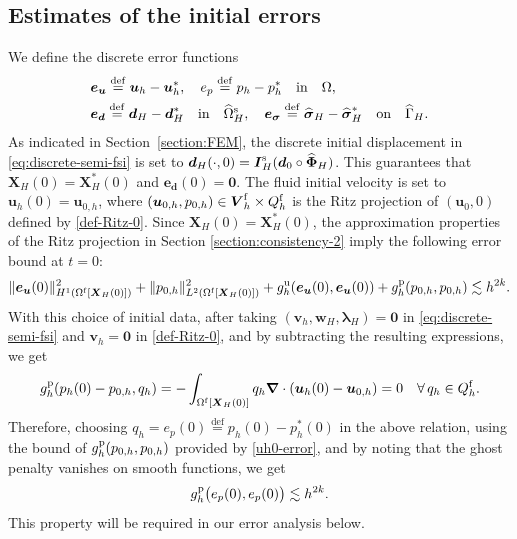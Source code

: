 \documentclass[11pt,reqno]{amsart}
\theoremstyle{definition}
\theoremstyle{plain}
\numberwithin{theorem}{section}
\numberwithin{proposition}{section}
\numberwithin{lemma}{section}
\numberwithin{equation}{section}
\newcommand{\bs}[1]{\boldsymbol{#1}}
\newcommand{\uu}[1]  {{\bs{#1}} }
\newcommand{\dep}{{{\bs{d}}}}
\newcommand{\grad}   { \uu{\nabla}    }
\newcommand{\bu}{\uu{u}}
\renewcommand{\(}{\bigl(}
\renewcommand{\)}{\bigr)}
\def\eqd{\stackrel{\mathrm{def}}{=}}
\begin{document}
\subsection{Estimates of the initial errors}
\label{section:initial-error}

We define the discrete error functions   
\begin{subequations}\label{def-eu-ed}
\begin{align}
&{\bs e}_{\bs u} \eqd {\bs u}_h - {\bs u}_h^*,
\quad {e}_{p} \eqd p_h - p_h^* \quad\mbox{in}\quad\Omega,\\
&{\bs e}_\dep \eqd \dep_H - \dep_H^* \quad\mbox{in}\quad\widehat{\Omega}^{\rm s}_H, 
\quad {\bs e}_{{\bs \sigma} } \eqd {\widehat{\bs \sigma} }_H - {\widehat{\bs \sigma} }_H^* \quad\mbox{on}\quad\widehat{\Gamma}_H .
\end{align}
\end{subequations}
As indicated in Section~\ref{section:FEM}, 
the discrete initial displacement in \eqref{eq:discrete-semi-fsi} is set to  $\dep_H(\cdot,0) =  {\bs I}_H^{\rm s} (\dep_0\circ\widehat{\bs\Phi}_H)$. This guarantees that ${\bs X}_H(0)={\bs X}_H^*(0)$ and ${\bs e}_\dep(0)=\bs 0$. 
The fluid initial velocity is set to ${\bs u}_h(0)={\bs u}_{0,h}$, where $({\bs u}_{0,h},p_{0,h}) \in {\bs V}_h^{\rm f} \times Q_h^{\rm f}$ is the Ritz projection of $({\bs u}_0,0)$   defined by \eqref{def-Ritz-0}. Since ${\bs X}_H(0)={\bs X}_H^*(0)$, the approximation properties of the Ritz projection in Section \ref{section:consistency-2} imply the following error bound at $t=0$: 
\begin{align}\label{uh0-error}
\|{\bs e}_{\bs u}(0)\|_{H^1(\Omega^{\rm f}[\bs X_H(0)])}^2
+ \|p_{0,h}\|_{L^2(\Omega^{\rm f}[{\bs X}_H(0)])}^2 
+ g^{\rm u}_h({\bs e}_{\bs u}(0),{\bs e}_{\bs u}(0)) 
+ g^{\rm p}_h(p_{0,h},p_{0,h})
\lesssim  h^{2k} . 
\end{align}
With this  choice of initial data, after taking $({\bs v}_h,{\bs w}_H,{\bs\lambda}_H)=\bs 0 $ in \eqref{eq:discrete-semi-fsi} and ${\bs v}_h=\bs 0$ in \eqref{def-Ritz-0}, and by subtracting the resulting expressions, we get 
\begin{align}\label{ghost-p0h-property}
g_h^{\rm p} (p_h(0)-p_{0,h}, q_h ) 
=
-\int_{\Omega^{\rm f}[\bs X_H(0)]}  q_h \grad\cdot (\bu_h(0) -\bu_{0,h}) 
= 0 
\quad\forall\, q_h\in Q_h^{\rm f} . 
\end{align}
Therefore, choosing $q_h=e_p(0)\eqd p_h(0)-p_h^*(0)$ in the above relation, using the bound of $ g^{\rm p}_h(p_{0,h},p_{0,h})$ provided by \eqref{uh0-error}, and by noting that the ghost penalty vanishes on smooth functions, we get    
\begin{align}\label{ghost-ep-0}
g_h^{\rm p} \big(e_p(0),e_p(0)\big) 
\lesssim h^{2k}. 
\end{align}
This property will be required in our error analysis below.  
\end{document}
